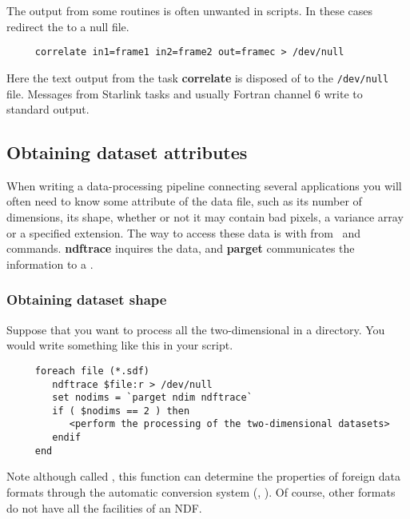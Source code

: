 The output from some routines is often unwanted in scripts.  In these
cases redirect the  to a
null file.

\small
\begin{verbatim}
     correlate in1=frame1 in2=frame2 out=framec > /dev/null
\end{verbatim}
\normalsize
Here the text output from the task {\bf correlate} is disposed of to
the {\tt /dev/null} file.  Messages from Starlink tasks and usually
Fortran channel 6 write to {\sf standard output}.

\newpage
\subsection{Obtaining dataset
attributes\label{sc4_se_dataset_attributes}}

When writing a data-processing pipeline connecting several applications
you will often need to know some attribute of the data file, such as
its number of dimensions, its shape, whether or not it may contain bad
pixels, a variance array or a specified extension.  The way to 
access these data is with  from
\KAPPAref\ and  commands.
{\bf ndftrace} inquires the data, and {\bf parget} communicates the
information to a .

\subsubsection{Obtaining dataset shape
\label{sc4_se_dataset_shape}}

Suppose that you want to process all the two-dimensional  in a directory.  You would write something like this in your
script.

\small
\begin{verbatim}
     foreach file (*.sdf)
        ndftrace $file:r > /dev/null
        set nodims = `parget ndim ndftrace`
        if ( $nodims == 2 ) then
           <perform the processing of the two-dimensional datasets>
        endif
     end
\end{verbatim}
\normalsize

Note although called , this
function can determine the properties of foreign data formats through
the automatic conversion system (, 
).  Of course, other formats do not have all the
facilities of an NDF.

